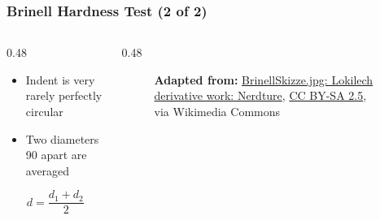 \begin{frame}
	\frametitle{Brinell Hardness Test (2 of 2)}

    \begin{columns}
        \begin{column}{0.48\linewidth}
            \begin{itemize}[<+- | alert@+>]
                \item Indent is very rarely perfectly circular
                \item Two diameters 90\textdegree{} apart are averaged
            \end{itemize}

            \[d=\dfrac{d_1 + d_2}{2}\]
        \end{column}
        \begin{column}{0.48\linewidth}
            \begin{figure}
                \centering
                \resizebox{0.375\linewidth}{!}{
                    
                }

                \vspace{0.5em}
                {\tiny \textbf{Adapted from:} \href{https://commons.wikimedia.org/wiki/File:BrinellHardness.svg}{BrinellSkizze.jpg: Lokilech derivative work: Nerdture}, \href{https://creativecommons.org/licenses/by-sa/2.5}{CC BY-SA 2.5}, via Wikimedia Commons\par}
            \end{figure}
        \end{column}
    \end{columns}
\end{frame}

